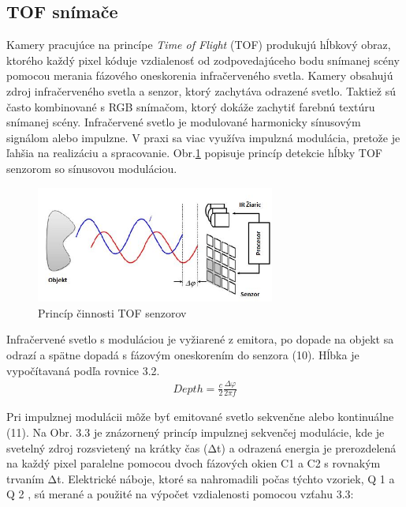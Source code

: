 \subsection{TOF snímače}
\label{sec:tof}
Kamery pracujúce na princípe \textit{Time of Flight} (TOF) produkujú hĺbkový obraz, ktorého každý pixel kóduje vzdialenosť od zodpovedajúceho bodu snímanej scény pomocou merania fázového oneskorenia infračerveného svetla. Kamery obsahujú zdroj infračerveného svetla a senzor, ktorý zachytáva odrazené svetlo. Taktiež sú často kombinované s RGB snímačom, ktorý dokáže zachytiť farebnú textúru snímanej scény. Infračervené svetlo je modulované harmonicky sínusovým signálom alebo impulzne. V praxi sa viac využíva impulzná modulácia, pretože je ľahšia na realizáciu a spracovanie. Obr.\ref{fig:tof_principle} popisuje princíp detekcie hĺbky TOF senzorom so sínusovou moduláciou.

\begin{figure}[h]
	\centering
	\includegraphics[width=0.7\textwidth]{figures/tof_principle.png} 
	\caption{Princíp činnosti TOF senzorov}
	\label{fig:tof_principle}
\end{figure}

Infračervené svetlo s moduláciou je vyžiarené z emitora, po dopade na objekt sa odrazí a spätne dopadá s fázovým oneskorením do senzora (10). Hĺbka je vypočítavaná podľa rovnice 3.2.
\begin{equation}
\label{eq2}
\begin{aligned}
Depth=\frac{c}{2}\frac{\Delta \varphi}{2 \pi f}
\end{aligned}
\end{equation}

Pri impulznej modulácii môže byť emitované svetlo sekvenčne alebo kontinuálne (11). Na Obr. 3.3 je znázornený princíp impulznej sekvenčej modulácie, kde je svetelný zdroj rozsvietený na krátky čas (Δt) a odrazená energia je prerozdelená na každý pixel paralelne pomocou dvoch fázových okien C1 a C2 s rovnakým trvaním Δt. Elektrické náboje, ktoré sa nahromadili počas týchto vzoriek, Q 1 a Q 2 , sú merané a použité na výpočet vzdialenosti pomocou vzťahu 3.3:

